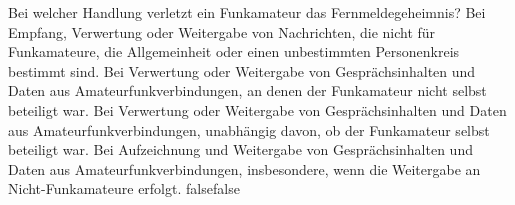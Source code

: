     {Bei welcher Handlung verletzt ein Funkamateur das Fernmeldegeheimnis?}
    {Bei Empfang, Verwertung oder Weitergabe von Nachrichten, die nicht für Funkamateure, die Allgemeinheit oder einen unbestimmten Personenkreis bestimmt sind.}
    {Bei Verwertung oder Weitergabe von Gesprächsinhalten und Daten aus Amateurfunkverbindungen, an denen der Funkamateur nicht selbst beteiligt war.}
    {Bei Verwertung oder Weitergabe von Gesprächsinhalten und Daten aus Amateurfunkverbindungen, unabhängig davon, ob der Funkamateur selbst beteiligt war.}
    {Bei Aufzeichnung und Weitergabe von Gesprächsinhalten und Daten aus Amateurfunkverbindungen, insbesondere, wenn die Weitergabe an Nicht-Funkamateure erfolgt.}
    {false}{false}